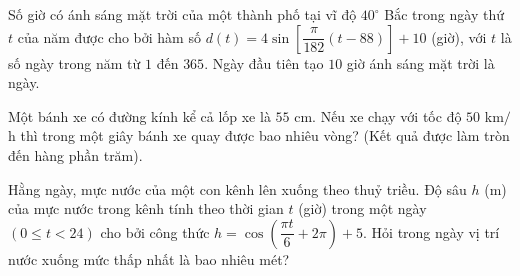 \begin{bt}%

	Số giờ có ánh sáng mặt trời của một thành phố tại vĩ độ $40^\circ$ Bắc trong ngày thứ $t$ của năm được cho bởi hàm số $d(t) = 4 \sin\left[\dfrac{\pi}{182}(t - 88)\right] + 10$ (giờ), với $t$ là số ngày trong năm từ $1$ đến $365$. Ngày đầu tiên tạo $10$ giờ ánh sáng mặt trời là ngày.
\end{bt}

\begin{bt}%

	Một bánh xe có đường kính kể cả lốp xe là $55$ cm. Nếu xe chạy với tốc độ $50$ km$/$h thì trong một giây bánh xe quay được bao nhiêu vòng? (Kết quả được làm tròn đến hàng phần trăm).
\end{bt}

\begin{bt}%

	Hằng ngày, mực nước của một con kênh lên xuống theo thuỷ triều. Độ sâu $h$ (m) của mực nước trong kênh tính theo thời gian $t$ (giờ) trong một ngày $(0 \leq t<24)$ cho bởi công thức $h=\cos \left(\dfrac{\pi t}{6}+2 \pi\right)+5$. Hỏi trong ngày vị trí nước xuống mức thấp nhất là bao nhiêu mét?
	
\end{bt}

